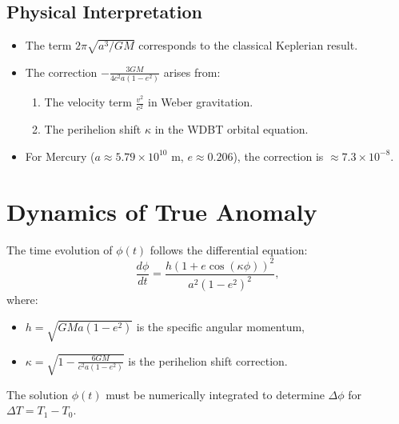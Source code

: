 \subsection*{Physical Interpretation}
\begin{itemize}
\item The term \( 2\pi \sqrt{a^3/GM} \) corresponds to the classical Keplerian result.
\item The correction \( -\frac{3GM}{4c^2 a(1-e^2)} \) arises from:
  \begin{enumerate}
  \item The velocity term \( \frac{v^2}{c^2} \) in Weber gravitation.
  \item The perihelion shift \( \kappa \) in the WDBT orbital equation.
  \end{enumerate}
\item For Mercury (\( a \approx 5.79 \times 10^{10} \) m, \( e \approx 0.206 \)), the correction is \( \approx 7.3 \times 10^{-8} \).
\end{itemize}

\section{Dynamics of True Anomaly}
The time evolution of \(\phi(t)\) follows the differential equation:
\[
\frac{d\phi}{dt} = \frac{h (1 + e \cos(\kappa \phi))^2}{a^2 (1-e^2)^2},
\]
where:
\begin{itemize}
\item \(h = \sqrt{GMa(1-e^2)}\) is the specific angular momentum,
\item \(\kappa = \sqrt{1 - \frac{6GM}{c^2 a(1-e^2)}}\) is the perihelion shift correction.
\end{itemize}
The solution \(\phi(t)\) must be numerically integrated to determine \(\Delta \phi\) for \(\Delta T = T_1 - T_0\).